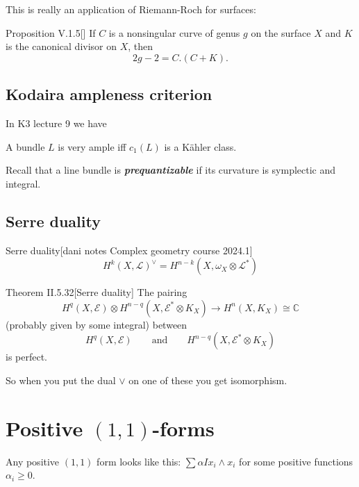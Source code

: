 This is really an application of Riemann-Roch for surfaces:

\begin{thing1}{Proposition V.1.5}[\cite{hart}]\leavevmode
If \(C\) is a nonsingular curve of genus \(g\) on the surface \(X\) and \(K\) is the canonical divisor on \(X\), then
\[2g-2=C.(C+K).\]

\end{thing1}

\subsection{Kodaira ampleness criterion}

In K3 lecture 9 we have

\begin{thm}[Kodaira]\leavevmode
A bundle \(L\) is very ample iff \(c_1(L)\) is a Kähler class.
\end{thm}

\begin{thing7}{Recall}\leavevmode
that a line bundle is \textit{\textbf{prequantizable}} if its curvature is symplectic and integral.
\end{thing7}

\subsection{Serre duality}

\begin{thing8}{Serre duality}[dani notes Complex geometry course 2024.1]\leavevmode
\[H^{k}(X,\mathcal{L})^{\vee}=H^{n-k}(X,\omega_X \otimes \mathcal{L}^*)\]
\end{thing8}

\begin{thing4}{Theorem II.5.32\cite{voi}}[Serre duality]\label{thm:5.32}\leavevmode
The pairing
\[H^{q}(X,\mathcal{E})\otimes H^{n-q}(X,\mathcal{E}^*\otimes K_X)\to H^{n}(X,K_X)\cong\mathbb{C}\]
(probably given by some integral) between
\[H^{q}(X,\mathcal{E})\qquad \text{and} \qquad H^{n-q}(X,\mathcal{E}^* \otimes K_X)\]
is perfect.
\end{thing4}
So when you put the dual \(\vee\) on one of these you get isomorphism.


\section{Positive \((1,1)\)-forms}
Any positive \((1,1)\) form looks like this: \(\sum \alpha I x_i \wedge x_i\) for some positive functions \(\alpha_i \geq 0\).

